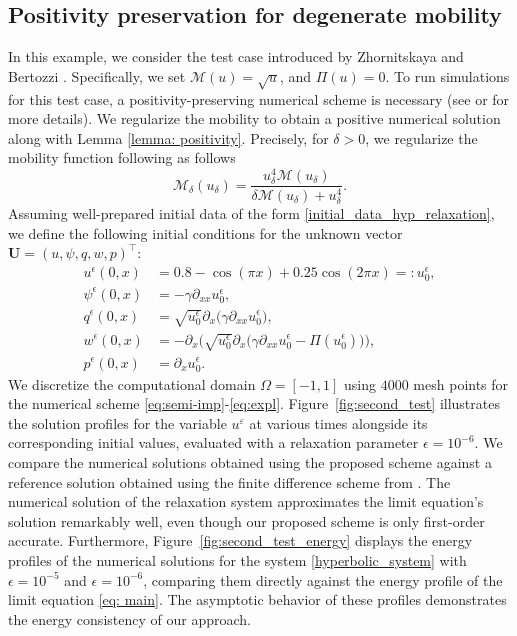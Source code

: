 \documentclass[11pt]{article}
\numberwithin{equation}{section}
\newtheorem{counter example}[theorem]{Counter Example}
\numberwithin{equation}{section}
\numberwithin{equation}{section}
\newcommand{\eps}{\varepsilon}
\begin{document}
\subsection{Positivity preservation for degenerate mobility}
\label{sec:1d_second}
In this example, we consider the test case introduced by Zhornitskaya and Bertozzi \cite{zhornitskaya1999positivity}. Specifically, we set $\mathcal{M}(u)=\sqrt{u}$, and $\Pi(u)=0$. To run simulations for this test case, a positivity-preserving numerical scheme is necessary (see \cite{zhornitskaya1999positivity} or \cite{grun2000nonnegativity} for more details). We regularize the mobility to obtain a positive numerical solution along with Lemma \ref{lemma: positivity}. Precisely, for $\delta>0$, we regularize the mobility function following \cite{zhornitskaya1999positivity} as follows
\[
\mathcal{M}_\delta(u_\delta)=\dfrac{u_\delta^4 \mathcal{M}(u_\delta)}{\delta \mathcal{M}(u_\delta)+u_\delta^4}.
\]
Assuming well-prepared initial data of the form \eqref{initial_data_hyp_relaxation}, we define the following initial conditions for the unknown vector $\mathbf{U} = (u, \psi, q, w, p)^\top$:
\begin{equation}
\begin{aligned}
    u^\epsilon(0,x) &= 0.8 - \cos(\pi x) + 0.25 \cos(2 \pi x) =: u_0^\epsilon,\\
    \psi^\epsilon(0,x) &= -\gamma\partial_{xx} u_0^\epsilon,\\
     q^\epsilon(0,x) &= \sqrt{u_0^\epsilon}\partial_x\big(\gamma \partial_{xx} u_0^\epsilon\big),\\
       w^\epsilon(0,x) &= -\partial_x\Big( \sqrt{u_0^\epsilon}\partial_x\big(\gamma \partial_{xx} u_0^\epsilon - \Pi(u_0^\epsilon)\big)\Big),\\
    p^\epsilon(0,x) &= \partial_x u_0^\epsilon.
  \end{aligned}
\end{equation}
We discretize the computational domain $\Omega=[-1,1]$ using $4000$ mesh points for the numerical scheme \eqref{eq:semi-imp}-\eqref{eq:expl}. Figure~\ref{fig:second_test} illustrates the solution profiles for the variable $u^\eps$ at various times alongside its corresponding initial values, evaluated with a relaxation parameter $\epsilon=10^{-6}$. We compare the numerical solutions obtained using the proposed scheme against a reference solution obtained using the finite difference scheme from \cite{zhornitskaya1999positivity}. The numerical solution of the relaxation system approximates the limit equation's solution remarkably well, even though our proposed scheme is only first-order accurate. Furthermore, Figure~\ref{fig:second_test_energy} displays the energy profiles of the numerical solutions for the system \eqref{hyperbolic_system} with $\epsilon=10^{-5}$ and $\epsilon=10^{-6}$, comparing them directly against the energy profile of the limit equation \eqref{eq: main}. The asymptotic behavior of these profiles demonstrates the energy consistency of our approach.
\end{document}
